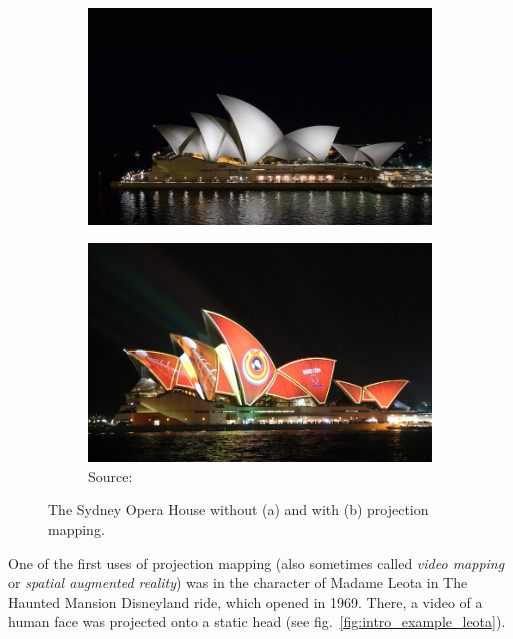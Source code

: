 \begin{figure}[ht]
    \centering
    \begin{subfigure}[b]{0.49\textwidth}
        \centering
        \includegraphics[width=\textwidth]{images/01-sydney_opera_house.jpg}
        \caption{}
    \end{subfigure}
    \hfill
    \begin{subfigure}[b]{0.49\textwidth}
        \centering
        \includegraphics[width=\textwidth]{images/01-sydney_opera_house_projection.jpg}
        \caption{Source: \citet{ImageProjectionMappingExampleSydney}}
    \end{subfigure}
    \caption{The Sydney Opera House without (a) and with (b) projection mapping.}
    \label{fig:intro_example_sydney}
\end{figure}

One of the first uses of projection mapping (also sometimes called \textit{video mapping} or \textit{spatial augmented reality}) was in the character of Madame Leota in The Haunted Mansion Disneyland ride, which opened in 1969. There, a video of a human face was projected onto a static head (see fig.~\ref{fig:intro_example_leota}).

